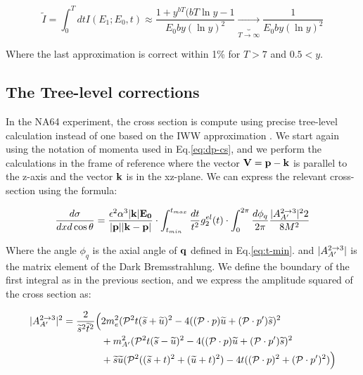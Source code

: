 \begin{equation}
  \label{eq:i-int}
  \widetilde{I} = \int^T_0 dt I(E_1; E_0, t) \approx \frac{1 + y^{bT}(bT\ln{y} - 1}{E_0by(\ln{y})^2} \underbrace{\to}_{T \to \infty} \frac{1}{E_0by(\ln{y})^2}
\end{equation}

Where the last approximation is correct within 1\% for $T>7$ and $0.5 < y$.



\subsection{The Tree-level corrections}
\label{appA:sec:cross-section-tl}

In the NA64 experiment, the cross section is compute using precise tree-level calculation instead of one based on the IWW approximation \cite{DMsimulation}. We start again using the notation of momenta used in Eq.\ref{eq:dp-cs}, and we perform the calculations in the frame of reference where the vector $\bf{V} = \bf{p} - \bf{k}$ is parallel to the z-axis and the vector $\bf{k}$ is in the xz-plane. We can express the relevant cross-section using the formula:

\begin{equation}
  \label{eq:cs-tl}
  \frac{d\sigma}{dx d\cos{\theta}} = \frac{\epsilon^2 \alpha^3 |\bf{k}| E_0}{|\bf{p}| |\bf{k} - \bf{p}|} \cdot \int_{t_{min}}^{t_{max}} \frac{dt}{t^2} g^{el}_{2}(t) \cdot \int_0^{2\pi} \frac{d\phi_q}{2\pi} \frac{|A^{2 \to 3}_{A'}|^22}{8 M^2}
\end{equation}

Where the angle $\phi_q$ is the axial angle of $\bf{q}$ defined in Eq.\ref{eq:t-min}. and $|A^{2 \to 3}_{A'}|$ is the matrix element of the Dark Bremsstrahlung. We define the boundary of the first integral as in the previous section, and we express the amplitude squared of the cross section as:

\begin{equation}
  \label{eq:cs-dp-amp}
  \begin{aligned}
    |A^{2 \to 3}_{A'}|^2 = \frac{2}{\widetilde{s}^2\widetilde{t}^2} \Big( &2m^2_e (\mathcal{P}^2 t (\widetilde{s} + \widetilde{u})^2 - 4((\mathcal{P} \cdot p)\widetilde{u} + (\mathcal{P} \cdot p')\widetilde{s})^2  \\
      &+ m^2_{A'}(\mathcal{P}^2 t (\widetilde{s} - \widetilde{u})^2 -4((\mathcal{P}\cdot p)\widetilde{u} + (\mathcal{P}\cdot p')\widetilde{s})^2 \\
      &+ \widetilde{s}\widetilde{u}(\mathcal{P}^2 ((\widetilde{s} + t)^2 + (\widetilde{u}+t)^2) - 4 t ((\mathcal{P} \cdot p)^2 + (\mathcal{P} \cdot p')^2) \Big)
  \end{aligned}    
\end{equation}


